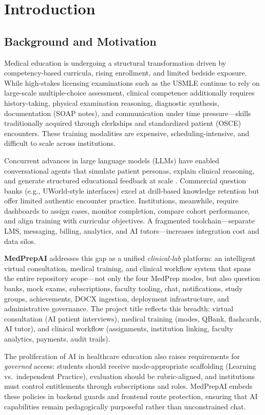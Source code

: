 \chapter{Introduction}

\section{Background and Motivation}
Medical education is undergoing a structural transformation driven by competency-based curricula, rising enrollment, and limited bedside exposure. While high-stakes licensing examinations such as the USMLE continue to rely on large-scale multiple-choice assessment, clinical competence additionally requires history-taking, physical examination reasoning, diagnostic synthesis, documentation (SOAP notes), and communication under time pressure---skills traditionally acquired through clerkships and standardized patient (OSCE) encounters. These training modalities are expensive, scheduling-intensive, and difficult to scale across institutions.

Concurrent advances in large language models (LLMs) have enabled conversational agents that simulate patient personas, explain clinical reasoning, and generate structured educational feedback at scale \cite{topol_highperf_2019,wartman_med_ed_2019}. Commercial question banks (e.g., UWorld-style interfaces) excel at drill-based knowledge retention but offer limited authentic encounter practice. Institutions, meanwhile, require dashboards to assign cases, monitor completion, compare cohort performance, and align training with curricular objectives. A fragmented toolchain---separate LMS, messaging, billing, analytics, and AI tutors---increases integration cost and data silos.

\textbf{MedPrepAI} addresses this gap as a unified \emph{clinical-lab} platform: an intelligent virtual consultation, medical training, and clinical workflow system that spans the entire repository scope---not only the four MedPrep modes, but also question banks, mock exams, subscriptions, faculty tooling, chat, notifications, study groups, achievements, DOCX ingestion, deployment infrastructure, and administrative governance. The project title reflects this breadth: virtual consultation (AI patient interviews), medical training (modes, QBank, flashcards, AI tutor), and clinical workflow (assignments, institution linking, faculty analytics, payments, audit trails).

The proliferation of AI in healthcare education also raises requirements for \emph{governed} access: students should receive mode-appropriate scaffolding (Learning vs.\ independent Practice), evaluation should be rubric-aligned, and institutions must control entitlements through subscriptions and roles. MedPrepAI embeds these policies in backend guards and frontend route protection, ensuring that AI capabilities remain pedagogically purposeful rather than unconstrained chat.

